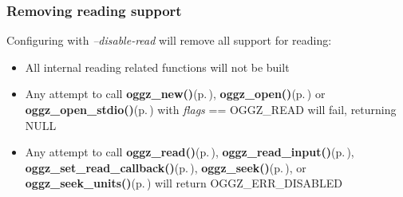 \subsubsection{Removing reading support}\label{no_decode}
Configuring with {\em --disable-read\/} will remove all support for reading:\begin{itemize}
\item All internal reading related functions will not be built\item Any attempt to call {\bf oggz\_\-new()}{\rm (p.\,\pageref{oggz_8h_a4})}, {\bf oggz\_\-open()}{\rm (p.\,\pageref{oggz_8h_a5})} or {\bf oggz\_\-open\_\-stdio()}{\rm (p.\,\pageref{oggz_8h_a6})} with {\em flags\/} == OGGZ\_\-READ will fail, returning NULL\item Any attempt to call {\bf oggz\_\-read()}{\rm (p.\,\pageref{group__read__api_a2})}, {\bf oggz\_\-read\_\-input()}{\rm (p.\,\pageref{group__read__api_a3})}, {\bf oggz\_\-set\_\-read\_\-callback()}{\rm (p.\,\pageref{group__read__api_a1})}, {\bf oggz\_\-seek()}{\rm (p.\,\pageref{group__seek__api_a6})}, or {\bf oggz\_\-seek\_\-units()}{\rm (p.\,\pageref{group__seek__api_a3})} will return OGGZ\_\-ERR\_\-DISABLED \end{itemize}


